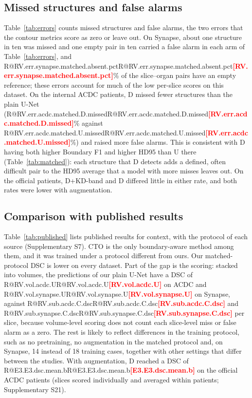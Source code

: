 \documentclass[fleqn,10pt,lineno]{wlpeerj}
\makeatletter
\newcommand{\R}[1]{\ifcsname R@#1\endcsname\csname R@#1\endcsname\else\textbf{\textcolor{red}{[#1]}}\fi}
\makeatother
\begin{document}
\subsection*{Missed structures and false alarms}
Table~\ref{tab:errors} counts missed structures and false alarms, the two errors that the contour metrics score as zero or leave out. On Synapse, about one structure in ten was missed and one empty pair in ten carried a false alarm in each arm of Table~\ref{tab:errors}, and \R{RV.err.synapse.matched.absent.pct}\% of the slice--organ pairs have an empty reference; these errors account for much of the low per-slice scores on this dataset. On the internal ACDC patients, D missed fewer structures than the plain U-Net (\R{RV.err.acdc.matched.D.missed}\% against \R{RV.err.acdc.matched.U.missed}\%) and raised more false alarms. This is consistent with D having both higher Boundary F1 and higher HD95 than U there (Table~\ref{tab:matched}): each structure that D detects adds a defined, often difficult pair to the HD95 average that a model with more misses leaves out. On the official patients, D+KD-band and D differed little in either rate, and both rates were lower with augmentation.

\begin{table}[!tb]
\centering
{\small}
\caption{\label{tab:errors}Missed structures and false alarms, mean $\pm$ SD over runs (post hoc, descriptive). Missed structures: share of image-- or slice--class pairs with a non-empty reference whose prediction is empty. False alarms: share of pairs with an empty reference whose prediction is not empty (ISIC2018 has no such pair). Pair counts, other arms and rates by structure size: Supplementary S8, S24.}
\end{table}

\subsection*{Comparison with published results}
Table~\ref{tab:published} lists published results for context, with the protocol of each source (Supplementary S7). CTO \citep{Lin2025Rethinking} is the only boundary-aware method among them, and it was trained under a protocol different from ours. Our matched-protocol DSC is lower on every dataset. Part of the gap is the scoring: stacked into volumes, the predictions of our plain U-Net have a DSC of \R{RV.vol.acdc.U} on ACDC and \R{RV.vol.synapse.U} on Synapse, against \R{RV.sub.acdc.C.dsc} and \R{RV.sub.synapse.C.dsc} per slice, because volume-level scoring does not count each slice-level miss or false alarm as a zero. The rest is likely to reflect differences in the training protocol, such as no pretraining, no augmentation in the matched protocol and, on Synapse, 14 instead of 18 training cases, together with other settings that differ between the studies. With augmentation, D reached a DSC of \R{E3.E3.dsc.mean.b} on the official ACDC patients (slices scored individually and averaged within patients; Supplementary S21).
\end{document}

